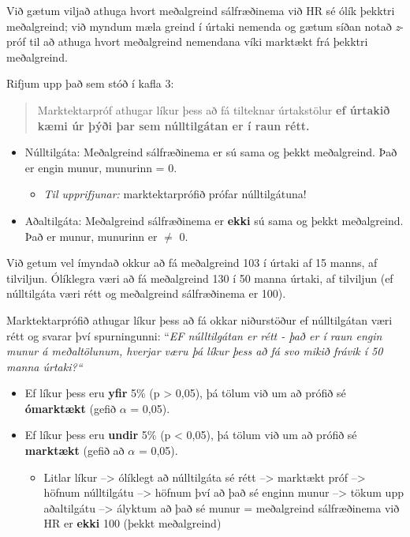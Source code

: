 \documentclass[
]{book}
\providecommand{\tightlist}{%
  \setlength{\itemsep}{0pt}\setlength{\parskip}{0pt}}
\begin{document}
Við gætum viljað athuga hvort meðalgreind sálfræðinema við HR sé ólík þekktri meðalgreind; við myndum mæla greind í úrtaki nemenda og gætum síðan notað \emph{z}-próf til að athuga hvort meðalgreind nemendana víki marktækt frá þekktri meðalgreind.

Rifjum upp það sem stóð í kafla 3:

\begin{quote}
Marktektarpróf athugar líkur þess að fá tilteknar úrtakstölur \textbf{ef úrtakið kæmi úr þýði þar sem núlltilgátan er í raun rétt.}
\end{quote}

\begin{itemize}
\item
  Núlltilgáta: Meðalgreind sálfræðinema er sú sama og þekkt meðalgreind. Það er engin munur, munurinn = 0.

  \begin{itemize}
  \tightlist
  \item
    \emph{Til upprifjunar:} marktektarprófið prófar núlltilgátuna!
  \end{itemize}
\item
  Aðaltilgáta: Meðalgreind sálfræðinema er \textbf{ekki} sú sama og þekkt meðalgreind. Það er munur, munurinn er \(\neq\) 0.
\end{itemize}

Við getum vel ímyndað okkur að fá meðalgreind 103 í úrtaki af 15 manns, af tilviljun. Ólíklegra væri að fá meðalgreind 130 í 50 manna úrtaki, af tilviljun (ef núlltilgáta væri rétt og meðalgreind sálfræðinema er 100).

Marktektarprófið athugar líkur þess að fá okkar niðurstöður ef núlltilgátan væri rétt og svarar því spurningunni: ``\emph{EF núlltilgátan er rétt - það er í raun engin munur á meðaltölunum, hverjar væru þá líkur þess að fá svo mikið frávik í 50 manna úrtaki?{}``}

\begin{itemize}
\tightlist
\item
  Ef líkur þess eru \textbf{yfir} 5\% (p \textgreater{} 0,05), þá tölum við um að prófið sé \textbf{ómarktækt} (gefið \(\alpha\) = 0,05).
\item
  Ef líkur þess eru \textbf{undir} 5\% (p \textless{} 0,05), þá tölum við um að prófið sé \textbf{marktækt} (gefið að \(\alpha\) = 0,05).

  \begin{itemize}
  \tightlist
  \item
    Litlar líkur --\textgreater{} ólíklegt að núlltilgáta sé rétt --\textgreater{} marktækt próf --\textgreater{} höfnum núlltilgátu --\textgreater{} höfnum því að það sé enginn munur --\textgreater{} tökum upp aðaltilgátu --\textgreater{} ályktum að það sé munur = meðalgreind sálfræðinema við HR er \textbf{ekki} 100 (þekkt meðalgreind)
  \end{itemize}
\end{itemize}
\end{document}
